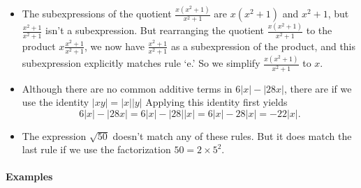 \documentclass[12pt,fleqn]{article}
\begin{document}
\begin{itemize}
\item The subexpressions of the quotient  $\displaystyle \frac{x (x^2+1)}{x^2 + 1}$ are $x (x^2+1)$ and $x^2 + 1$, but
$\frac{x^2+1}{x^2 + 1}$ isn't a subexpression.  But rearranging the quotient $\displaystyle \frac{x (x^2+1)}{x^2 + 1}$ to the product $\displaystyle x \frac{x^2+1}{x^2 + 1}$, we now have $ \frac{x^2+1}{x^2 + 1}$ as a subexpression of the product, and this subexpression 
explicitly matches rule `e.' So we simplify $\displaystyle \frac{x (x^2+1)}{x^2 + 1}$ to $x$.

\item Although there are no common additive terms in $ 6 |x| - |28 x|$, there are if we use the identity $|x y| = |x| |y|$  Applying this identity
first yields
\[
    6 |x| - |28 x| = 6 |x| - |28| |x| = 6 |x| - 28 |x| = -22 |x|.
\]

\item The expression $\sqrt{50}$ doesn't match any of these rules.  But it does match the last rule if we use the factorization $50 = 2 \times 5^2$.

\end{itemize}



\noindent 

\paragraph{Examples} 
\end{document}
